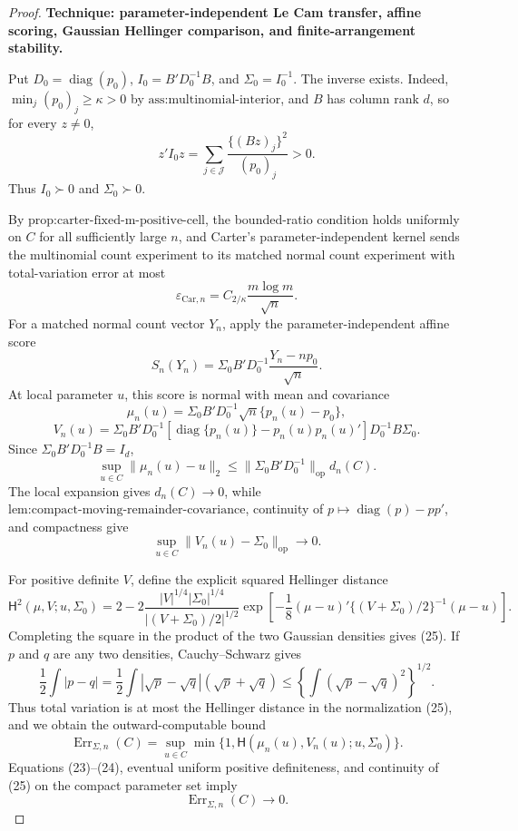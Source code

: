 \documentclass{article}
\begin{document}
\begin{proof}
\textbf{Technique: parameter-independent Le Cam transfer, affine scoring, Gaussian Hellinger comparison, and finite-arrangement stability.}

Put \(D_0=\operatorname{diag}(p_0)\), \(I_0=B'D_0^{-1}B\), and \(\Sigma_0=I_0^{-1}\).  The inverse exists.  Indeed, \(\min_j(p_0)_j\ge\kappa>0\) by \(\text{ass:multinomial-interior}\), and \(B\) has column rank \(d\), so for every \(z\ne0\),
\[
 z'I_0z=\sum_{j\in\mathcal J}\frac{\{(Bz)_j\}^2}{(p_0)_j}>0.
 \tag{18}
\]
Thus \(I_0\succ0\) and \(\Sigma_0\succ0\).

By \(\text{prop:carter-fixed-m-positive-cell}\), the bounded-ratio condition holds uniformly on \(C\) for all sufficiently large \(n\), and Carter's parameter-independent kernel sends the multinomial count experiment to its matched normal count experiment with total-variation error at most
\[
 \varepsilon_{\mathrm{Car},n}
 =C_{2/\kappa}\frac{m\log m}{\sqrt n}.
 \tag{19}
\]
For a matched normal count vector \(Y_n\), apply the parameter-independent affine score
\[
 S_n(Y_n)=\Sigma_0B'D_0^{-1}\frac{Y_n-np_0}{\sqrt n}.
 \tag{20}
\]
At local parameter \(u\), this score is normal with mean and covariance
\[
 \mu_n(u)=\Sigma_0B'D_0^{-1}\sqrt n\{p_n(u)-p_0\},
 \tag{21}
\]
\[
 V_n(u)=\Sigma_0B'D_0^{-1}
 [\operatorname{diag}\{p_n(u)\}-p_n(u)p_n(u)']
 D_0^{-1}B\Sigma_0.
 \tag{22}
\]
Since \(\Sigma_0B'D_0^{-1}B=I_d\),
\[
 \sup_{u\in C}\|\mu_n(u)-u\|_2
 \le \|\Sigma_0B'D_0^{-1}\|_{\mathrm{op}}d_n(C).
 \tag{23}
\]
The local expansion gives \(d_n(C)\to0\), while \(\text{lem:compact-moving-remainder-covariance}\), continuity of \(p\mapsto\operatorname{diag}(p)-pp'\), and compactness give
\[
 \sup_{u\in C}\|V_n(u)-\Sigma_0\|_{\mathrm{op}}\longrightarrow0.
 \tag{24}
\]

For positive definite \(V\), define the explicit squared Hellinger distance
\[
 \mathsf H^2(\mu,V;u,\Sigma_0)
 =2-2\frac{|V|^{1/4}|\Sigma_0|^{1/4}}
 {|(V+\Sigma_0)/2|^{1/2}}
 \exp\!\left[-\frac18(\mu-u)'
 \{(V+\Sigma_0)/2\}^{-1}(\mu-u)\right].
 \tag{25}
\]
Completing the square in the product of the two Gaussian densities gives (25).  If \(p\) and \(q\) are any two densities, Cauchy--Schwarz gives
\[
 \frac12\int|p-q|
 =\frac12\int|\sqrt p-\sqrt q|(\sqrt p+\sqrt q)
 \le\left\{\int(\sqrt p-\sqrt q)^2\right\}^{1/2}.
\]
Thus total variation is at most the Hellinger distance in the normalization (25), and we obtain the outward-computable bound
\[
 \operatorname{Err}_{\Sigma,n}(C)
 =\sup_{u\in C}\min\{1,
 \mathsf H(\mu_n(u),V_n(u);u,\Sigma_0)\}.
 \tag{26}
\]
Equations (23)--(24), eventual uniform positive definiteness, and continuity of (25) on the compact parameter set imply
\[
 \operatorname{Err}_{\Sigma,n}(C)\longrightarrow0.
 \tag{27}
\]


\end{proof}
\end{document}
